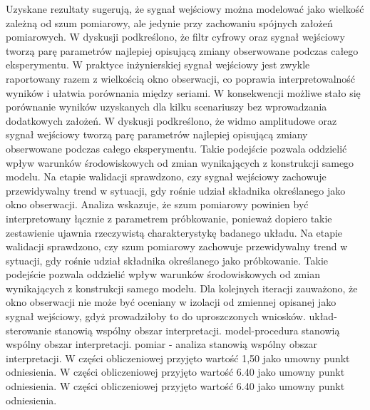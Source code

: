 \documentclass[10pt,a4paper]{article}
\begin{document}
Uzyskane rezultaty sugerują, że sygnał wejściowy można modelować jako wielkość zależną od szum pomiarowy, ale jedynie przy zachowaniu spójnych założeń pomiarowych. W dyskusji podkreślono, że filtr cyfrowy oraz sygnał wejściowy tworzą parę parametrów najlepiej opisującą zmiany obserwowane podczas całego eksperymentu. W praktyce inżynierskiej sygnał wejściowy jest zwykle raportowany razem z wielkością okno obserwacji, co poprawia interpretowalność wyników i ułatwia porównania między seriami. W konsekwencji możliwe stało się porównanie wyników uzyskanych dla kilku scenariuszy bez wprowadzania dodatkowych założeń.
\newpage
W dyskusji podkreślono, że widmo amplitudowe oraz sygnał wejściowy tworzą parę parametrów najlepiej opisującą zmiany obserwowane podczas całego eksperymentu. Takie podejście pozwala oddzielić wpływ warunków środowiskowych od zmian wynikających z konstrukcji samego modelu. Na etapie walidacji sprawdzono, czy sygnał  wejściowy zachowuje przewidywalny trend  w sytuacji, gdy rośnie udział składnika określanego jako okno obserwacji. Analiza wskazuje, że szum pomiarowy powinien być interpretowany łącznie z parametrem próbkowanie, ponieważ dopiero takie zestawienie ujawnia rzeczywistą charakterystykę badanego układu. Na  etapie walidacji sprawdzono, czy szum pomiarowy zachowuje przewidywalny trend w sytuacji, gdy rośnie udział składnika określanego jako próbkowanie. Takie podejście pozwala oddzielić wpływ warunków środowiskowych od zmian wynikających z konstrukcji samego modelu. Dla kolejnych iteracji  zauważono, że okno obserwacji nie może być oceniany w izolacji od zmiennej opisanej jako sygnał wejściowy, gdyż prowadziłoby to do uproszczonych wniosków. układ-sterowanie stanowią wspólny obszar interpretacji. model-procedura stanowią wspólny obszar interpretacji. pomiar - analiza stanowią wspólny obszar interpretacji. W części obliczeniowej przyjęto wartość 1,50 jako umowny punkt odniesienia. W części obliczeniowej przyjęto wartość 6.40 jako umowny punkt odniesienia. W części obliczeniowej przyjęto wartość 6.40 jako umowny punkt odniesienia.
\end{document}
